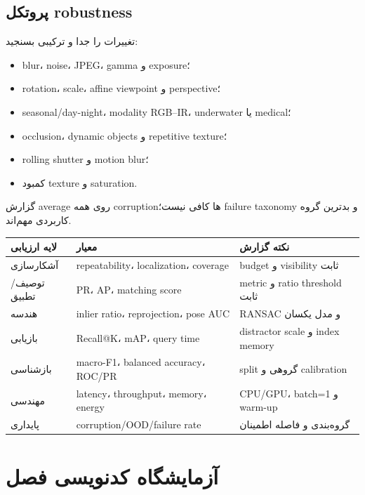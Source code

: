 \documentclass[12pt,openany,oneside]{book}
\begin{document}
\subsection{پروتکل robustness}
تغییرات را جدا و ترکیبی بسنجید:
\begin{itemize}
\item blur، noise، JPEG، gamma و exposure؛
\item rotation، scale، affine viewpoint و perspective؛
\item seasonal/day-night، modality RGB--IR، underwater یا medical؛
\item occlusion، dynamic objects و repetitive texture؛
\item rolling shutter و motion blur؛
\item کمبود texture و saturation.
\end{itemize}
گزارش average روی همه corruptionها کافی نیست؛ failure taxonomy و بدترین گروه کاربردی مهم‌اند.

\begin{longtable}{p{33mm}p{49mm}p{55mm}}
\toprule
لایه ارزیابی & معیار & نکته گزارش \\
\midrule
آشکارسازی & repeatability، localization، coverage & budget و visibility ثابت \\
توصیف/تطبیق & PR، AP، matching score & metric و ratio threshold ثابت \\
هندسه & inlier ratio، reprojection، pose AUC & RANSAC و مدل یکسان \\
بازیابی & Recall@K، mAP، query time & distractor scale و index memory \\
بازشناسی & macro-F1، balanced accuracy، ROC/PR & split گروهی و calibration \\
مهندسی & latency، throughput، memory، energy & CPU/GPU، batch=1 و warm-up \\
پایداری & corruption/OOD/failure rate & گروه‌بندی و فاصله اطمینان \\
\bottomrule
\end{longtable}

\section{آزمایشگاه کدنویسی فصل}
\end{document}
